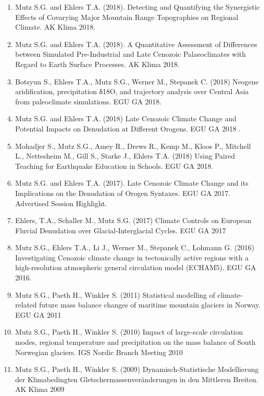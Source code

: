 \documentclass[
  letterpaper,
  DIV=11,
  numbers=noendperiod]{scrartcl}
\begin{document}
\begin{enumerate}
  Response to Global Paleoclimate Change. EGU GA 2019.
\item
  Mutz S.G. and Ehlers T.A. (2018). Detecting and Quantifying the
  Synergistic Effects of Covarying Major Mountain Range Topographies on
  Regional Climate. AK Klima 2018.
\item
  Mutz S.G. and Ehlers T.A. (2018). A Quantitative Assessment of
  Differences between Simulated Pre-Industrial and Late Cenozoic
  Palaeoclimates with Regard to Earth Surface Processes. AK Klima 2018.
\item
  Botsyun S., Ehlers T.A., Mutz S.G., Werner M., Stepanek C. (2018)
  Neogene aridiﬁcation, precipitation δ18O, and trajectory analysis over
  Central Asia from paleoclimate simulations. EGU GA 2018.
\item
  Mutz S.G. and Ehlers T.A. (2018) Late Cenozoic Climate Change and
  Potential Impacts on Denudation at Different Orogens. EGU GA 2018 .
\item
  Mohadjer S., Mutz S.G., Amey R., Drews R., Kemp M., Kloos P., Mitchell
  L., Nettesheim M., Gill S., Starke J., Ehlers T.A. (2018) Using Paired
  Teaching for Earthquake Education in Schools. EGU GA 2018.
\item
  Mutz S.G. and Ehlers T.A. (2017). Late Cenozoic Climate Change and its
  Implications on the Denudation of Orogen Syntaxes. EGU GA 2017.
  Advertised Session Highlight.
\item
  Ehlers, T.A., Schaller M., Mutz S.G. (2017) Climate Controls on
  European Fluvial Denudation over Glacial-Interglacial Cycles. EGU GA
  2017
\item
  Mutz S.G., Ehlers T.A., Li J., Werner M., Stepanek C., Lohmann G.
  (2016) Investigating Cenozoic climate change in tectonically active
  regions with a high-resolution atmospheric general circulation model
  (ECHAM5). EGU GA 2016.
\item
  Mutz S.G., Paeth H., Winkler S. (2011) Statistical modelling of
  climate-related future mass balance changes of maritime mountain
  glaciers in Norway. EGU GA 2011
\item
  Mutz S.G., Paeth H., Winkler S. (2010) Impact of large-scale
  circulation modes, regional temperature and precipitation on the mass
  balance of South Norwegian glaciers. IGS Nordic Branch Meeting 2010
\item
  Mutz S.G., Paeth H., Winkler S. (2009) Dynamisch-Statistische
  Modellierung der Klimabedingten Gletschermassenveränderungen in den
  Mittleren Breiten. AK Klima 2009
\end{enumerate}
\end{document}
